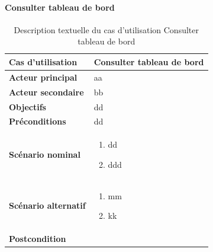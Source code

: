         \paragraph[Consulter tableau de bord]{Consulter tableau de bord}
        \begin{longtable}{p{4cm} p{9cm}}
            \caption{Description textuelle du cas d’utilisation Consulter tableau de bord}
            \label{table:usecaseConsDash}
            \\\hline\hline
                \textbf{Cas d’utilisation} & \textbf{Consulter tableau de bord}
            \\\hline\hline
                    \textbf{Acteur principal} & aa
                \\
                    \textbf{Acteur secondaire} & bb
                \\
                    \textbf{Objectifs} & dd
                \\
                    \textbf{Préconditions} & dd
                \\
                \textbf{Scénario nominal} &
                    \begin{enumerate}[leftmargin=*]
                        \item dd
                        \item ddd
                    \end{enumerate}
                \\
                \textbf{Scénario alternatif} &
                    \begin{enumerate}[leftmargin=*]
                        \item mm
                        \item kk
                    \end{enumerate}
                \\
                \textbf{Postcondition}
            \\\bottomrule
        \end{longtable}

